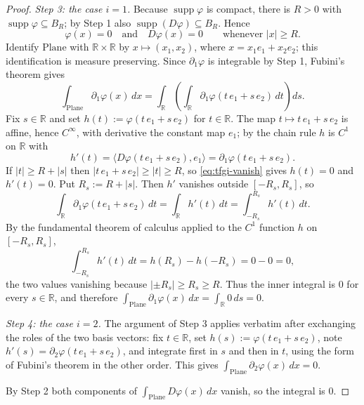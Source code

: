 \begin{proof}
\emph{Step 3: the case $i=1$.}  Because $\operatorname{supp}\varphi$ is compact, there is
$R>0$ with $\operatorname{supp}\varphi\subseteq B_R$; by Step 1 also
$\operatorname{supp}(D\varphi)\subseteq B_R$.  Hence
\begin{equation}\label{eq:tfgi-vanish}
  \varphi(x)=0\quad\text{and}\quad D\varphi(x)=0\qquad\text{whenever }\lvert x\rvert\ge R .
\end{equation}
Identify $\mathrm{Plane}$ with $\mathbb{R}\times\mathbb{R}$ by $x\mapsto(x_1,x_2)$, where
$x=x_1e_1+x_2e_2$; this identification is measure preserving.  Since $\partial_1\varphi$ is
integrable by Step 1, Fubini's theorem gives
\[
  \int_{\mathrm{Plane}}\partial_1\varphi(x)\,dx
  =\int_{\mathbb{R}}\left(\int_{\mathbb{R}}\partial_1\varphi(t\,e_1+s\,e_2)\,dt\right)ds .
\]
Fix $s\in\mathbb{R}$ and set $h(t):=\varphi(t\,e_1+s\,e_2)$ for $t\in\mathbb{R}$.  The map
$t\mapsto t\,e_1+s\,e_2$ is affine, hence $C^\infty$, with derivative the constant map
$e_1$; by the chain rule $h$ is $C^1$ on $\mathbb{R}$ with
\[
  h'(t)=\langle D\varphi(t\,e_1+s\,e_2),e_1\rangle=\partial_1\varphi(t\,e_1+s\,e_2).
\]
If $\lvert t\rvert\ge R+\lvert s\rvert$ then $\lvert t\,e_1+s\,e_2\rvert\ge\lvert t\rvert\ge R$,
so \eqref{eq:tfgi-vanish} gives $h(t)=0$ and $h'(t)=0$.  Put $R_s:=R+\lvert s\rvert$.  Then
$h'$ vanishes outside $[-R_s,R_s]$, so
\[
  \int_{\mathbb{R}}\partial_1\varphi(t\,e_1+s\,e_2)\,dt
  =\int_{\mathbb{R}}h'(t)\,dt=\int_{-R_s}^{R_s}h'(t)\,dt .
\]
By the fundamental theorem of calculus applied to the $C^1$ function $h$ on
$[-R_s,R_s]$,
\[
  \int_{-R_s}^{R_s}h'(t)\,dt=h(R_s)-h(-R_s)=0-0=0 ,
\]
the two values vanishing because $\lvert\pm R_s\rvert\ge R_s\ge R$.  Thus the inner integral
is $0$ for every $s\in\mathbb{R}$, and therefore
$\int_{\mathrm{Plane}}\partial_1\varphi(x)\,dx=\int_{\mathbb{R}}0\,ds=0$.

\emph{Step 4: the case $i=2$.}  The argument of Step 3 applies verbatim after exchanging the
roles of the two basis vectors: fix $t\in\mathbb{R}$, set $h(s):=\varphi(t\,e_1+s\,e_2)$, note
$h'(s)=\partial_2\varphi(t\,e_1+s\,e_2)$, and integrate first in $s$ and then in $t$, using the
form of Fubini's theorem in the other order.  This gives
$\int_{\mathrm{Plane}}\partial_2\varphi(x)\,dx=0$.

By Step 2 both components of $\int_{\mathrm{Plane}}D\varphi(x)\,dx$ vanish, so the integral is
$0$.
\end{proof}
